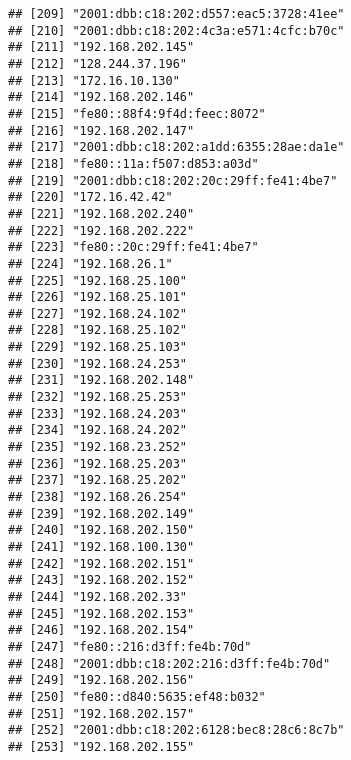 \documentclass[
]{article}
\newenvironment{Shaded}{\begin{snugshade}}{\end{snugshade}}
\newcommand{\AttributeTok}[1]{\textcolor[rgb]{0.77,0.63,0.00}{#1}}
\newcommand{\FunctionTok}[1]{\textcolor[rgb]{0.00,0.00,0.00}{#1}}
\newcommand{\NormalTok}[1]{#1}
\newcommand{\OtherTok}[1]{\textcolor[rgb]{0.56,0.35,0.01}{#1}}
\newcommand{\SpecialCharTok}[1]{\textcolor[rgb]{0.00,0.00,0.00}{#1}}
\newcommand{\StringTok}[1]{\textcolor[rgb]{0.31,0.60,0.02}{#1}}
\begin{document}
\begin{verbatim}
## [209] "2001:dbb:c18:202:d557:eac5:3728:41ee"
## [210] "2001:dbb:c18:202:4c3a:e571:4cfc:b70c"
## [211] "192.168.202.145"                     
## [212] "128.244.37.196"                      
## [213] "172.16.10.130"                       
## [214] "192.168.202.146"                     
## [215] "fe80::88f4:9f4d:feec:8072"           
## [216] "192.168.202.147"                     
## [217] "2001:dbb:c18:202:a1dd:6355:28ae:da1e"
## [218] "fe80::11a:f507:d853:a03d"            
## [219] "2001:dbb:c18:202:20c:29ff:fe41:4be7" 
## [220] "172.16.42.42"                        
## [221] "192.168.202.240"                     
## [222] "192.168.202.222"                     
## [223] "fe80::20c:29ff:fe41:4be7"            
## [224] "192.168.26.1"                        
## [225] "192.168.25.100"                      
## [226] "192.168.25.101"                      
## [227] "192.168.24.102"                      
## [228] "192.168.25.102"                      
## [229] "192.168.25.103"                      
## [230] "192.168.24.253"                      
## [231] "192.168.202.148"                     
## [232] "192.168.25.253"                      
## [233] "192.168.24.203"                      
## [234] "192.168.24.202"                      
## [235] "192.168.23.252"                      
## [236] "192.168.25.203"                      
## [237] "192.168.25.202"                      
## [238] "192.168.26.254"                      
## [239] "192.168.202.149"                     
## [240] "192.168.202.150"                     
## [241] "192.168.100.130"                     
## [242] "192.168.202.151"                     
## [243] "192.168.202.152"                     
## [244] "192.168.202.33"                      
## [245] "192.168.202.153"                     
## [246] "192.168.202.154"                     
## [247] "fe80::216:d3ff:fe4b:70d"             
## [248] "2001:dbb:c18:202:216:d3ff:fe4b:70d"  
## [249] "192.168.202.156"                     
## [250] "fe80::d840:5635:ef48:b032"           
## [251] "192.168.202.157"                     
## [252] "2001:dbb:c18:202:6128:bec8:28c6:8c7b"
## [253] "192.168.202.155"
\end{verbatim}

\begin{Shaded}
\end{Shaded}
\end{document}

